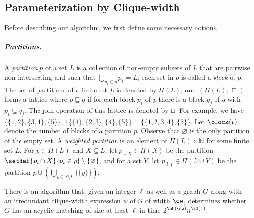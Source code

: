 \subsection{Parameterization by Clique-width}\label{subsec:acyclic:cw}

Before describing our algorithm, we first define some necessary notions.


\subparagraph{Partitions.}
A \emph{partition} $p$ of a set $L$ is a collection of non-empty subsets of $L$
that are pairwise non-intersecting and such that $\bigcup_{p_i \in p} p_i = L$;
each set in $p$ is called a \emph{block} of $p$.
The set of partitions of a finite set $L$ is denoted by $\Pi(L)$,
and $(\Pi(L),\sqsubseteq)$ forms a lattice where $p \sqsubseteq q$
if for each block $p_i$ of $p$ there is a block $q_j$ of $q$ with
$p_i \subseteq q_j$.
The join operation of this lattice is denoted by $\sqcup$.
For example, we have $\{ \{ 1,2\},\{3,4\},\{5\}\} \sqcup \{\{1\},\{2,3\},\{4\},\{5\}\}= \{ \{ 1,2,3,4\}, \{5\}\}$.
Let $\block(p)$ denote the number of blocks of a partition $p$.
Observe that $\varnothing$ is the only partition of the empty set.
A \emph{weighted partition} is an element of $\Pi(L) \times \mathbb{N}$ for some finite set $L$.
For $p \in \Pi(L)$ and $X \subseteq L$, let $p_{\downarrow X} \in \Pi(X)$ be the partition
$\setdef{p_i \cap X}{p_i \in p} \setminus \{\varnothing\}$,
and for a set $Y$, let $p_{\uparrow Y} \in \Pi(L \cup Y)$ be the partition
$p \cup \left(\bigcup_{y \in Y \setminus L} \{\{y\}\}\right)$.



\begin{theoremrep}[\appsymb]
    There is an algorithm that,
    given an integer $\ell$ as well as a graph $G$ along with an irredundant clique-width expression $\psi$ of $G$ of width $\cw$,
    determines whether $G$ has an acyclic matching of size at least $\ell$ in time $2^{\bO(\cw)} n^{\bO(1)}$.
\end{theoremrep}

